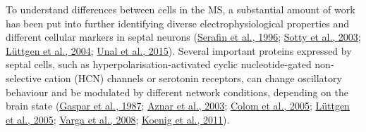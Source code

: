 \documentclass[
  12pt,
  a4paper,
  openany]{book}
\begin{document}
\noindent
To understand differences between cells in the MS, a substantial amount of work has been put into further identifying diverse electrophysiological properties and different cellular markers in septal neurons (\protect\hyperlink{ref-serafin_rhythmic_1996}{Serafin et al., 1996}; \protect\hyperlink{ref-sotty_distinct_2003}{Sotty et al., 2003}; \protect\hyperlink{ref-luttgen_chemical_2004}{Lüttgen et al., 2004}; \protect\hyperlink{ref-unal_synaptic_2015}{Unal et al., 2015}). Several important proteins expressed by septal cells, such as hyperpolarisation-activated cyclic nucleotide-gated non-selective cation (HCN) channels or serotonin receptors, can change oscillatory behaviour and be modulated by different network conditions, depending on the brain state (\protect\hyperlink{ref-gaspar_somatostatin_1987}{Gaspar et al., 1987}; \protect\hyperlink{ref-aznar_5-ht1a_2003}{Aznar et al., 2003}; \protect\hyperlink{ref-colom_characterization_2005}{Colom et al., 2005}; \protect\hyperlink{ref-luttgen_5-ht1a_2005}{Lüttgen et al., 2005}; \protect\hyperlink{ref-varga_presence_2008}{Varga et al., 2008}; \protect\hyperlink{ref-koenig_spatial_2011}{Koenig et al., 2011}).
\end{document}
